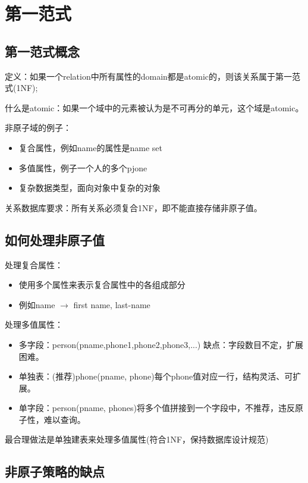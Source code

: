 \section{第一范式}

\subsection{第一范式概念}

定义：如果一个relation中所有属性的domain都是atomic的，则该关系属于第一范式(1NF);

什么是atomic：如果一个域中的元素被认为是不可再分的单元，这个域是atomic。

非原子域的例子：
\begin{itemize}
    \item 复合属性，例如name的属性是name set
    \item 多值属性，例子一个人的多个pjone
    \item 复杂数据类型，面向对象中复杂的对象
\end{itemize}

关系数据库要求：所有关系必须复合1NF，即不能直接存储非原子值。

\subsection{如何处理非原子值}

处理复合属性：
\begin{itemize}
    \item 使用多个属性来表示复合属性中的各组成部分
    \item 例如name $\to$ first name, last-name
\end{itemize}

处理多值属性：
\begin{itemize}
    \item 多字段：person(pname,phone1,phone2,phone3,...) 缺点：字段数目不定，扩展困难。
    \item 单独表：(推荐)phone(pname, phone)每个phone值对应一行，结构灵活、可扩展。
    \item 单字段：person(pname, phones)将多个值拼接到一个字段中，不推荐，违反原子性，难以查询。
\end{itemize}

最合理做法是单独建表来处理多值属性(符合1NF，保持数据库设计规范)

\subsection{非原子策略的缺点}

